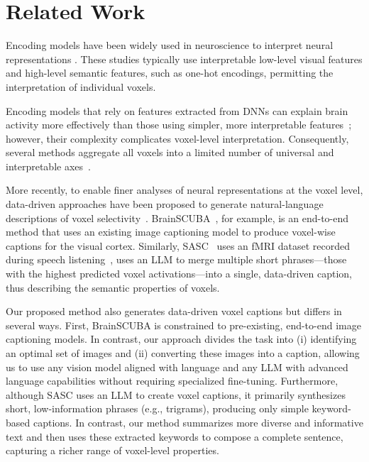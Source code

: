 \section{Related Work}

Encoding models have been widely used in neuroscience to interpret neural representations \cite{kay2008identifying, nishimoto2011reconstructing, naselaris2011encoding, huth2012continuous}. These studies typically use interpretable low-level visual features and high-level semantic features, such as one-hot encodings, permitting the interpretation of individual voxels.

Encoding models that rely on features extracted from DNNs can explain brain activity more effectively than those using simpler, more interpretable features~\cite{gucclu2015deep, schrimpf2021neural, takagi2023high, antonello2024scaling}; however, their complexity complicates voxel-level interpretation. Consequently, several methods aggregate all voxels into a limited number of universal and interpretable axes~\cite{huth2016natural, lescroart2019human, nakagi2024unveiling}.

More recently, to enable finer analyses of neural representations at the voxel level, data-driven approaches have been proposed to generate natural-language descriptions of voxel selectivity~\cite{luo2023brainscuba, singh2023explainingblackboxtext}. BrainSCUBA~\cite{luo2023brainscuba}, for example, is an end-to-end method that uses an existing image captioning model to produce voxel-wise captions for the visual cortex. Similarly, SASC~\cite{singh2023explainingblackboxtext} uses an fMRI dataset recorded during speech listening~\cite{lebel2023natural}, uses an LLM to merge multiple short phrases—those with the highest predicted voxel activations—into a single, data-driven caption, thus describing the semantic properties of voxels.

Our proposed method also generates data-driven voxel captions but differs in several ways. First, BrainSCUBA is constrained to pre-existing, end-to-end image captioning models. In contrast, our approach divides the task into (i) identifying an optimal set of images and (ii) converting these images into a caption, allowing us to use any vision model aligned with language and any LLM with advanced language capabilities without requiring specialized fine-tuning. Furthermore, although SASC uses an LLM to create voxel captions, it primarily synthesizes short, low-information phrases (e.g., trigrams), producing only simple keyword-based captions. In contrast, our method summarizes more diverse and informative text and then uses these extracted keywords to compose a complete sentence, capturing a richer range of voxel-level properties.